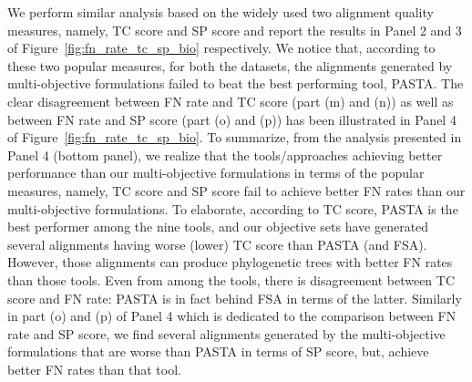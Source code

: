 We perform similar analysis based on the widely used two alignment quality measures, namely, TC score and SP score and report the results in Panel 2 and 3 of Figure~\ref{fig:fn_rate_tc_sp_bio} respectively. We notice that, according to these two popular measures, for both the datasets, the alignments generated by multi-objective formulations failed to beat the best performing tool, PASTA. The clear disagreement between FN rate and TC score (part (m) and (n)) as well as between FN rate and SP score (part (o) and (p)) has been illustrated in Panel 4 of Figure~\ref{fig:fn_rate_tc_sp_bio}. To summarize, from the analysis presented in Panel 4 (bottom panel), we realize that the tools/approaches achieving better performance than our multi-objective formulations in terms of the popular measures, namely, TC score and SP score fail to achieve better FN rates than our multi-objective formulations. To elaborate, according to TC score, PASTA is the best performer among the nine tools, and our objective sets have generated several alignments having worse (lower) TC score than PASTA (and FSA). However, those alignments can produce phylogenetic trees with better FN rates than those tools. Even from among the tools, there is disagreement between TC score and FN rate: PASTA is in fact behind FSA in terms of the latter. Similarly in part (o) and (p) of Panel 4 which is dedicated to the comparison between FN rate and SP score, we find several alignments generated by the multi-objective formulations that are worse than PASTA in terms of SP score, but, achieve better FN rates than that tool. 


